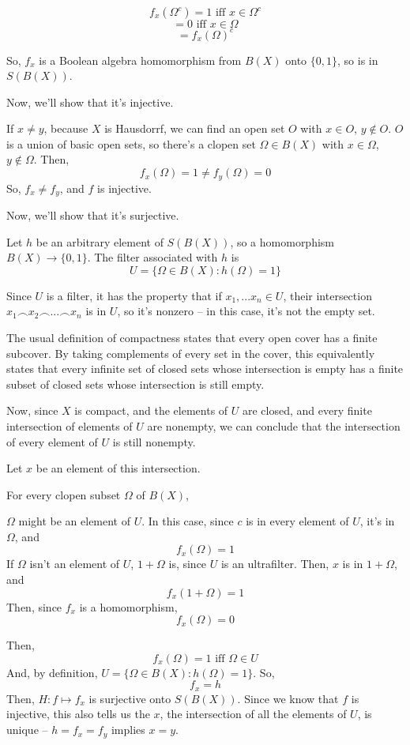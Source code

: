 \documentclass{article}
\begin{document}
      \[f_x(\Omega^c) = 1 \text{ iff } x \in \Omega^c\]
      \[ = 0 \text{ iff } x \in \Omega\]
      \[ = f_x(\Omega)^c\]

      So, $f_x$ is a Boolean algebra homomorphism from $B(X)$ onto $\{0,1\}$, so
      is in $S(B(X))$.

      Now, we'll show that it's injective.

      If $x \neq y$, because $X$ is Hausdorrf, we can find an open set $O$ with
      $x \in O$, $y \notin O$. $O$ is a union of basic open sets, so there's a
      clopen set $\Omega \in B(X)$ with $x \in \Omega$, $y\notin \Omega$. Then,
      \[f_x(\Omega) = 1 \neq f_y(\Omega) = 0\]
      So, $f_x \neq f_y$, and $f$ is injective.

      Now, we'll show that it's surjective.

      Let $h$ be an arbitrary element of $S(B(X))$, so a homomorphism $B(X)
      \rightarrow \{0,1\}$. The filter associated with $h$ is
      \[U = \{\Omega \in B(X) : h(\Omega) = 1\}\]

      Since $U$ is a filter, it has the property that if $x_1, ... x_n \in U$,
      their intersection $x_1 \frown x_2 \frown ... \frown x_n$ is in $U$, so
      it's nonzero -- in this case, it's not the empty set.

      The usual definition of compactness states that every open cover has a
      finite subcover. By taking complements of every set in the cover, this
      equivalently states that every infinite set of closed sets whose
      intersection is empty has a finite subset of closed sets whose
      intersection is still empty.

      Now, since $X$ is compact, and the elements of $U$ are closed, and every
      finite intersection of elements of $U$ are nonempty, we can conclude that
      the intersection of every element of $U$ is still nonempty.

      Let $x$ be an element of this intersection.

      For every clopen subset $\Omega$ of $B(X)$,

      $\Omega$ might be an element of $U$. In this case, since $c$ is in every
      element of $U$, it's in $\Omega$, and
      \[f_x(\Omega) = 1\]
      If $\Omega$ isn't an element of $U$, $1+\Omega$ is, since $U$ is an
      ultrafilter. Then, $x$ is in $1+\Omega$, and
      \[f_x(1+\Omega) = 1\]
      Then, since $f_x$ is a homomorphism,
      \[f_x(\Omega) = 0\]

      Then,
      \[f_x(\Omega) = 1 \text{ iff } \Omega \in U\]
      And, by definition, $U = \{\Omega \in B(X) : h(\Omega) = 1\}$. So,
      \[f_x = h\]
      Then, $H: f \mapsto f_x$ is surjective onto $S(B(X))$. Since we know that
      $f$ is injective, this also tells us the $x$, the intersection of all the
      elements of $U$, is unique -- $h = f_x = f_y$ implies $x=y$.
\end{document}
